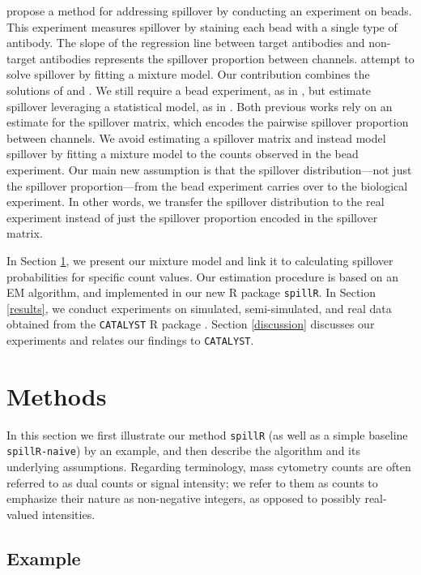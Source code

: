 \documentclass{bioinfo}
\begin{document}
\citet{catalyst} propose a method for addressing spillover by conducting
an experiment on beads. This experiment measures spillover by staining
each bead with a single type of antibody. The slope of the regression
line between target antibodies and non-target antibodies represents the
spillover proportion between channels. \citet{miao2021ab} attempt to
solve spillover by fitting a mixture model. Our contribution combines
the solutions of \citet{catalyst} and \citet{miao2021ab}. We still
require a bead experiment, as in \citet{catalyst}, but estimate
spillover leveraging a statistical model, as in \citet{miao2021ab}. Both
previous works rely on an estimate for the spillover matrix, which
encodes the pairwise spillover proportion between channels. We avoid
estimating a spillover matrix and instead model spillover by fitting a
mixture model to the counts observed in the bead experiment. Our main
new assumption is that the spillover distribution---not just the
spillover proportion---from the bead experiment carries over to the
biological experiment. In other words, we transfer the spillover
distribution to the real experiment instead of just the spillover
proportion encoded in the spillover matrix.

In Section \ref{methods}, we present our mixture model and link it to
calculating spillover probabilities for specific count values. Our
estimation procedure is based on an EM algorithm, and implemented in our
new R package \texttt{spillR}. In Section \ref{results}, we conduct
experiments on simulated, semi-simulated, and real data obtained from
the \texttt{CATALYST} R package \citep{catalyst}. Section
\ref{discussion} discusses our experiments and relates our findings to
\texttt{CATALYST}.

\section{Methods}

\label{methods}

In this section we first illustrate our method \texttt{spillR} (as well
as a simple baseline \texttt{spillR-naive}) by an example, and then
describe the algorithm and its underlying assumptions. Regarding
terminology, mass cytometry counts are often referred to as dual counts
or signal intensity; we refer to them as counts to emphasize their
nature as non-negative integers, as opposed to possibly real-valued
intensities.

\subsection{Example}
\end{document}
